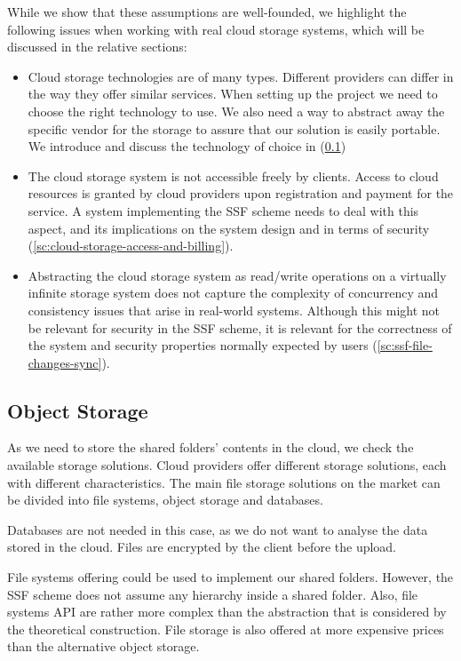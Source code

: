 While we show that these assumptions are well-founded,
we highlight the following issues when working with
real cloud storage systems, which will be discussed in the
relative sections:
\begin{itemize}
    \item Cloud storage technologies are of many types.
    Different providers can differ in the way they
    offer similar services.
    When setting up the project we need to choose the right
    technology to use. We also need a way to
    abstract away the specific vendor for the storage
    to assure that our solution is easily portable.
    We introduce and discuss the technology of choice in (\cref{ssc:object-storage})
    \item The cloud storage system is not accessible freely
    by clients. Access to cloud resources is
    granted by cloud providers upon registration and payment
    for the service. A system implementing the SSF scheme
    needs to deal with this aspect, and its implications
    on the system design and in terms of security (\cref{sc:cloud-storage-access-and-billing}).
    \item Abstracting the cloud storage system as read/write
    operations on a virtually infinite storage system does
    not capture the complexity of concurrency and consistency
    issues that arise in real-world systems. Although this
    might not be relevant for security in the SSF scheme,
    it is relevant for the correctness of the system and
    security properties normally expected by users (\cref{sc:ssf-file-changes-sync}).
\end{itemize}

\subsection{Object Storage}\label{ssc:object-storage}
As we need to store the shared folders' contents in the cloud,
we check the available storage solutions.
Cloud providers offer different storage solutions,
each with different characteristics. The main file
storage solutions on the market can be divided into
file systems, object storage and databases.

Databases are not needed in this case,
as we do not want to analyse the data stored in
the cloud. Files are encrypted by the client
before the upload.

File systems offering could be used to implement
our shared folders. However, the SSF scheme does not
assume any hierarchy inside a shared folder.
Also, file systems API are rather more complex
than the abstraction that is considered by the
theoretical construction. File storage is also offered
at more expensive prices than the alternative object storage.

